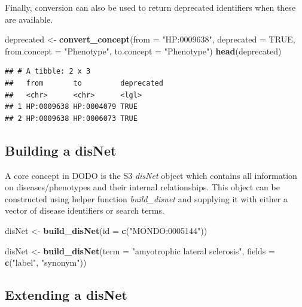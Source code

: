 \documentclass[9pt,a4paper,]{extarticle}
\newenvironment{Shaded}{\begin{snugshade}}{\end{snugshade}}
\newcommand{\DataTypeTok}[1]{\textcolor[rgb]{0.13,0.29,0.53}{#1}}
\newcommand{\KeywordTok}[1]{\textcolor[rgb]{0.13,0.29,0.53}{\textbf{#1}}}
\newcommand{\NormalTok}[1]{#1}
\newcommand{\OtherTok}[1]{\textcolor[rgb]{0.56,0.35,0.01}{#1}}
\newcommand{\StringTok}[1]{\textcolor[rgb]{0.31,0.60,0.02}{#1}}
\begin{document}
Finally, conversion can also be used to return deprecated identifiers when these are available.

\begin{Shaded}
\begin{Highlighting}[]
\NormalTok{deprecated <-}\StringTok{ }\KeywordTok{convert_concept}\NormalTok{(}\DataTypeTok{from =} \StringTok{"HP:0009638"}\NormalTok{,}
                               \DataTypeTok{deprecated =} \OtherTok{TRUE}\NormalTok{,}
                               \DataTypeTok{from.concept =} \StringTok{"Phenotype"}\NormalTok{,}
                               \DataTypeTok{to.concept =} \StringTok{"Phenotype"}\NormalTok{) }
\KeywordTok{head}\NormalTok{(deprecated)}
\end{Highlighting}
\end{Shaded}

\begin{verbatim}
## # A tibble: 2 x 3
##   from       to         deprecated
##   <chr>      <chr>      <lgl>     
## 1 HP:0009638 HP:0004079 TRUE      
## 2 HP:0009638 HP:0006073 TRUE
\end{verbatim}

\hypertarget{building-a-disnet}{%
\subsection{Building a disNet}\label{building-a-disnet}}

A core concept in DODO is the S3 \emph{disNet} object which contains all information on diseases/phenotypes and their internal relationships. This object can be constructed using helper function \emph{build\_disnet} and supplying it with either a vector of disease identifiers or search terms.

\begin{Shaded}
\begin{Highlighting}[]
\NormalTok{disNet <-}\StringTok{ }\KeywordTok{build_disNet}\NormalTok{(}\DataTypeTok{id =} \KeywordTok{c}\NormalTok{(}\StringTok{"MONDO:0005144"}\NormalTok{))}

\NormalTok{disNet <-}\StringTok{ }\KeywordTok{build_disNet}\NormalTok{(}\DataTypeTok{term =} \StringTok{"amyotrophic lateral sclerosis"}\NormalTok{, }
                       \DataTypeTok{fields =} \KeywordTok{c}\NormalTok{(}\StringTok{"label"}\NormalTok{, }\StringTok{"synonym"}\NormalTok{))}
\end{Highlighting}
\end{Shaded}

\hypertarget{extending-a-disnet}{%
\subsection{Extending a disNet}\label{extending-a-disnet}}
\end{document}
